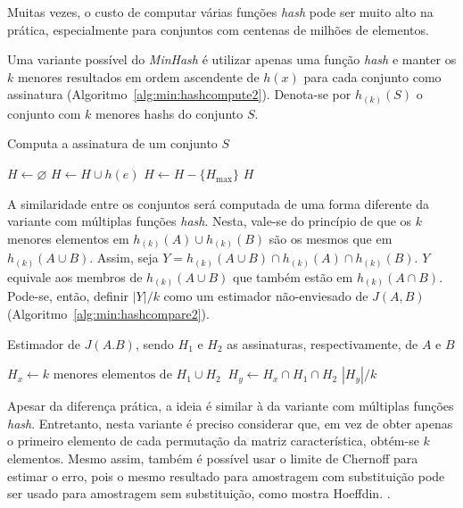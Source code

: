 Muitas vezes, o custo de computar várias funções \emph{hash} pode ser muito alto na prática, especialmente para conjuntos com centenas de milhões de elementos.

Uma variante possível do \emph{MinHash} é utilizar apenas uma função \emph{hash} e manter os $k$ menores resultados em ordem ascendente de $h(x)$ para cada conjunto como assinatura (Algoritmo~\ref{alg:min:hashcompute2}). Denota-se por $h_{(k)}(S)$ o conjunto com $k$ menores hashs do conjunto $S$. 

\begin{algorithm}
\linespread{1}\selectfont
\caption{Computa a assinatura de um conjunto $S$}
\label{alg:min:hashcompute2}
\begin{algorithmic}[1]
    \State $H \gets \varnothing$
        \State $H \gets H \cup h(e)$
            \State $H \gets H - \{H_{\max}\}$
        \EndIf
    \EndFor
	\Return $H$
\EndFunction
\end{algorithmic}
\end{algorithm}

A similaridade entre os conjuntos será computada de uma forma diferente da variante com múltiplas funções \emph{hash}. Nesta, vale-se do princípio de que os $k$ menores elementos em $h_{(k)}(A) \cup h_{(k)}(B)$ são os mesmos que em $h_{(k)}(A \cup B)$. Assim, seja $Y = h_{(k)}(A \cup B) \cap h_{(k)}(A) \cap h_{(k)}(B)$.  $Y$ equivale aos membros de $h_{(k)}(A \cup B)$ que também estão em $ h_{(k)}(A \cap B)$. Pode-se, então, definir $|Y|/k$ como um estimador não-enviesado de $J(A, B)$ (Algoritmo~\ref{alg:min:hashcompare2}).

\begin{algorithm}
\linespread{1}\selectfont
\caption{Estimador de $J(A. B)$, sendo $H_1$ e $H_2$ as assinaturas, respectivamente, de $A$ e $B$}
\label{alg:min:hashcompare2}
\begin{algorithmic}[1]
    \State $H_x \gets k \text{ menores elementos de } H_1 \cup H_2 \ $
    \State $H_y \gets H_x \cap H_1 \cap H_2 $
	\Return $|H_y|/k$
\EndFunction
\end{algorithmic}
\end{algorithm}

Apesar da diferença prática, a ideia é similar à da variante com múltiplas funções \emph{hash}. Entretanto, nesta variante é preciso considerar que, em vez de obter apenas o primeiro elemento de cada permutação da matriz característica, obtém-se $k$ elementos. Mesmo assim, também é possível usar o limite de Chernoff para estimar o erro, pois o mesmo resultado para amostragem com substituição pode ser usado para amostragem sem substituição, como mostra Hoeffdin. \cite{hoeffding1963probability,bardenet2015concentration}.

